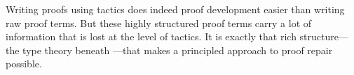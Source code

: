 Writing proofs using tactics does indeed proof development easier than writing raw proof terms.
But these highly structured proof terms carry a lot of information that is lost at the level of tactics.
It is exactly that rich structure---the type theory beneath ---that makes a principled approach to proof repair possible.





